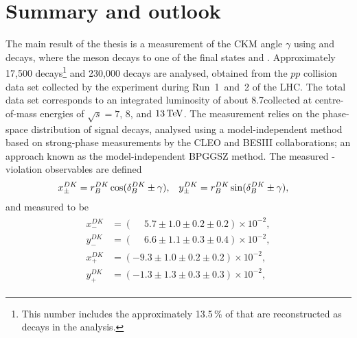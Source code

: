 

\chapter{Summary and outlook}
\label{ch:6-conclusion}

The main result of the thesis is a measurement of the CKM angle $\gamma$ using \BtoDK and \BtoDpi decays, where the \D meson decays to one of the final states \Kspipi and \KsKK. Approximately 17,500 \BtoDK decays\footnote{This number includes the approximately 13.5\,\% of \BtoDK that are reconstructed as \BtoDpi decays in the analysis.} and 230,000 \BtoDpi decays are analysed, obtained from the $pp$ collision data set collected by the \lhcb experiment during Run~1~and~2 of the LHC. The total data set corresponds to an integrated luminosity of about 8.7\invfb collected at centre-of-mass energies of $\sqrt s =7$, $8$, and $13\text{\,Te\kern -0.1em V}$. The measurement relies on the phase-space distribution of signal decays, analysed using a model-independent method based on strong-phase measurements by the CLEO and BESIII collaborations; an approach known as the model-independent BPGGSZ method. The measured \CP-violation observables are defined
\begin{align}
    x_\pm^{{D}{K}} &= r_B^{DK} \cos (\delta_B^{DK} \pm \gamma), & y_\pm^{{D}{K}} &= r_B^{DK} \sin (\delta_B^{DK} \pm \gamma),
\end{align}
and measured to be
\begin{align}
\begin{split}
    x_-^{DK} & = (\phantom{-}5.7 \pm 1.0 \pm  0.2\pm 0.2) \times 10^{-2}, \\
    y_-^{DK} & = (\phantom{-}6.6 \pm 1.1 \pm  0.3\pm 0.4) \times 10^{-2}, \\
    x_+^{DK} & = (         - 9.3 \pm 1.0 \pm  0.2\pm 0.2) \times 10^{-2}, \\
    y_+^{DK} & = (         - 1.3 \pm 1.3 \pm  0.3\pm 0.3) \times 10^{-2},
\end{split}
\end{align}

